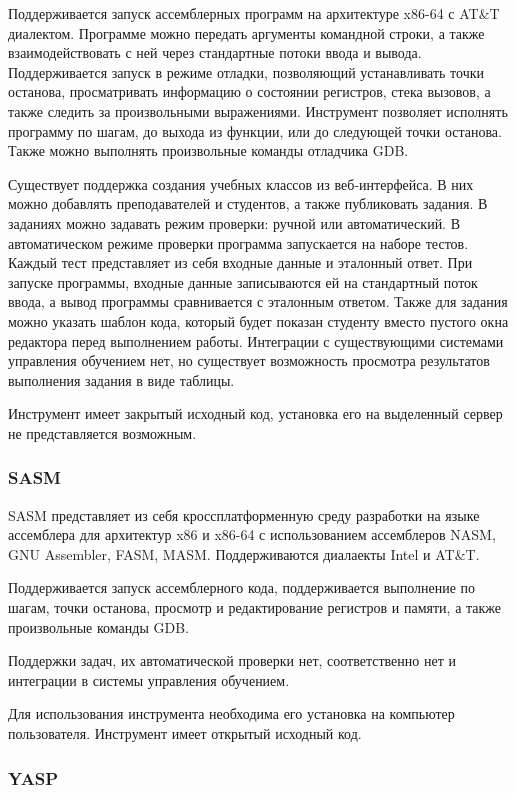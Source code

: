 \documentclass[a4paper,article,14pt]{extarticle}
\begin{document}
Поддерживается запуск ассемблерных программ на архитектуре x86-64 с AT\&T диалектом. Программе можно передать аргументы командной строки, а также взаимодействовать с ней через стандартные потоки ввода и вывода. Поддерживается запуск в режиме отладки, позволяющий устанавливать точки останова, просматривать информацию о состоянии регистров, стека вызовов, а также следить за произвольными выражениями. Инструмент позволяет исполнять программу по шагам, до выхода из функции, или до следующей точки останова. Также можно выполнять произвольные команды отладчика GDB.

Существует поддержка создания учебных классов из веб-интерфейса. В них можно добавлять преподавателей и студентов, а также публиковать задания. В заданиях можно задавать режим проверки: ручной или автоматический. В автоматическом режиме проверки программа запускается на наборе тестов. Каждый тест представляет из себя входные данные и эталонный ответ. При запуске программы, входные данные записываются ей на стандартный поток ввода, а вывод программы сравнивается с эталонным ответом. Также для задания можно указать шаблон кода, который будет показан студенту вместо пустого окна редактора перед выполнением работы. Интеграции с существующими системами управления обучением нет, но существует возможность просмотра результатов выполнения задания в виде таблицы.

Инструмент имеет закрытый исходный код, установка его на выделенный сервер не представляется возможным.

\subsubsection{SASM}

SASM\cite{sasm} представляет из себя кроссплатформенную среду разработки на языке ассемблера для архитектур x86 и x86-64 с использованием ассемблеров NASM, GNU Assembler, FASM, MASM. Поддерживаются диалаекты Intel и AT\&T.

Поддерживается запуск ассемблерного кода, поддерживается выполнение по шагам, точки останова, просмотр и редактирование регистров и памяти, а также произвольные команды GDB.

Поддержки задач, их автоматической проверки нет, соответственно нет и интеграции в системы управления обучением.

Для использования инструмента необходима его установка на компьютер пользователя. Инструмент имеет открытый исходный код.

\subsubsection{YASP}
\end{document}
